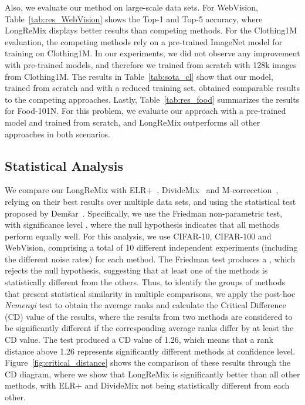 \documentclass[review]{elsarticle}
\begin{document}
Also, we evaluate our method on large-scale data sets. For WebVision, 
Table~\ref{tab:res_WebVision} shows the Top-1 and Top-5 accuracy, where LongReMix displays better results than competing methods. 
For the Clothing1M evaluation, 
the competing methods rely on a pre-trained ImageNet model for training on Clothing1M. In our experiments, we did not observe any improvement with pre-trained models, and therefore we trained from scratch with 128k images from Clothing1M. The results in Table~\ref{tab:sota_cl} show that our model, trained from scratch and with a reduced training set, obtained comparable results to the competing approaches. Lastly, Table~\ref{tab:res_food} summarizes the results for Food-101N. 
For this problem, we evaluate our approach with a pre-trained model and trained from scratch, and LongReMix outperforms all other approaches in both scenarios.

\subsection{Statistical Analysis}

We compare our LongReMix 
with ELR+~\cite{liu2020early}, DivideMix~\cite{li2020dividemix} and M-correcction~\cite{arazo2019unsupervised}, relying on their best results over multiple data sets, and using the statistical test proposed by Dem{\v{s}}ar~\cite{demvsar2006statistical}.
Specifically, we use the Friedman non-parametric test, with significance level , 
where the null hypothesis indicates that
all methods perform equally well.
For this analysis, we use CIFAR-10, CIFAR-100 and WebVision, comprising a total of 10 different independent experiments (including the different noise rates) for each method. 
The Friedman test produces a ,
which rejects the null hypothesis, suggesting that at least one of the methods is statistically different from the others. 
Thus, to identify the groups of methods that present statistical similarity in multiple comparisons, we apply the post-hoc \textit{Nemenyi} test to obtain the average ranks and calculate the Critical Difference (CD) value of the results, where the results from two methods are considered to be significantly different if the corresponding average
ranks differ by at least the CD value. The test produced a CD value of 1.26, which means that a rank distance above 1.26 represents significantly different methods at  confidence level. 
Figure~\ref{fig:critical_distance} shows the comparison of these results through the CD diagram, where we show that LongReMix is significantly better than all other methods, with ELR+ and DivideMix not being statistically different from each other.
\end{document}
